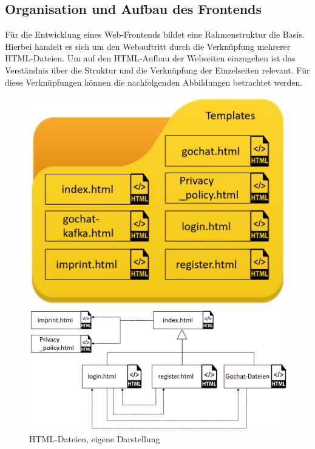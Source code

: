 \documentclass[a4paper,titlepage,halfparskip,12pt]{scrreprt}
\begin{document}
\begin{onehalfspacing}
\section{Organisation und Aufbau des Frontends}
\label{AufbauFrontendXMPP}
Für die Entwicklung eines Web-Frontends bildet eine Rahmenstruktur die Basis. Hierbei handelt es sich um den Webauftritt durch die Verknüpfung mehrerer HTML-Dateien.\cite{buhler2017html5}
Um auf den \ac{HTML}-Aufbau der Webseiten einzugehen ist das Verständnis über die Struktur und die Verknüpfung der Einzelseiten relevant. Für diese Verknüpfungen können die nachfolgenden Abbildungen betrachtet werden.
\begin{figure}[h]
	\begin{minipage}[c]{.38\textwidth}
		\includegraphics[scale=0.45]{images/HTMLDateienOrdner}
		\caption{HTML-Dateien, eigene Darstellung}
		\label{img:HTMLDateienOrdner}
	\end{minipage}
	\hspace{0.05\linewidth}%
	\begin{minipage}[c]{.5\textwidth}
		\includegraphics[scale=0.5]{images/HTMLDateienAufrufbaum}

\end{minipage}
\end{figure}
\end{onehalfspacing}
\end{document}
